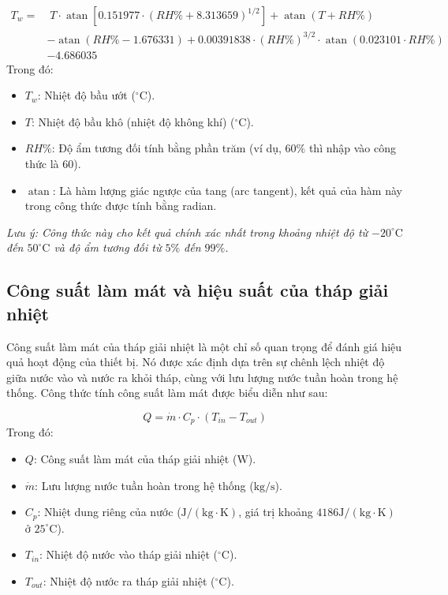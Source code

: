 \documentclass[../main.tex]{subfiles}
\begin{document}
\begin{equation}
\begin{split}
    T_w = & \; T \cdot \operatorname{atan}\left[0.151977 \cdot (RH\% + 8.313659)^{1/2}\right] + \operatorname{atan}(T + RH\%) \\
          & - \operatorname{atan}(RH\% - 1.676331) + 0.00391838 \cdot (RH\%)^{3/2} \cdot \operatorname{atan}(0.023101 \cdot RH\%) \\
          & - 4.686035
\end{split}
\end{equation}
Trong đó:
\begin{itemize}
    \item $T_w$: Nhiệt độ bầu ướt ($^\circ\mathrm{C}$).
    \item $T$: Nhiệt độ bầu khô (nhiệt độ không khí) ($^\circ\mathrm{C}$).
    \item $RH\%$: Độ ẩm tương đối tính bằng phần trăm (ví dụ, $60\%$ thì nhập vào công thức là $60$).
    \item $\operatorname{atan}$: Là hàm lượng giác ngược của tang (arc tangent), kết quả của hàm này trong công thức được tính bằng radian.
\end{itemize}

\textit{Lưu ý: Công thức này cho kết quả chính xác nhất trong khoảng nhiệt độ từ $-20^\circ\mathrm{C}$ đến $50^\circ\mathrm{C}$ và độ ẩm tương đối từ $5\%$ đến $99\%$.}

\subsection{Công suất làm mát và hiệu suất của tháp giải nhiệt}
\label{sec:cooling_capacity_efficiency}

Công suất làm mát của tháp giải nhiệt là một chỉ số quan trọng để đánh giá hiệu quả hoạt động của thiết bị. Nó được xác định dựa trên sự chênh lệch nhiệt độ giữa nước vào và nước ra khỏi tháp, cùng với lưu lượng nước tuần hoàn trong hệ thống. Công thức tính công suất làm mát được biểu diễn như sau:

\begin{equation}
    Q = \dot{m} \cdot C_p \cdot (T_{in} - T_{out})
\end{equation}
Trong đó:
\begin{itemize}
    \item $Q$: Công suất làm mát của tháp giải nhiệt ($\mathrm{W}$).
    \item $\dot{m}$: Lưu lượng nước tuần hoàn trong hệ thống ($\mathrm{kg/s}$).
    \item $C_p$: Nhiệt dung riêng của nước ($\mathrm{J/(kg \cdot K)}$, giá trị khoảng $4186 \mathrm{J/(kg \cdot K)}$ ở $25^\circ\mathrm{C}$).
    \item $T_{in}$: Nhiệt độ nước vào tháp giải nhiệt ($^\circ\mathrm{C}$).
    \item $T_{out}$: Nhiệt độ nước ra tháp giải nhiệt ($^\circ\mathrm{C}$).
\end{itemize}
\end{document}
